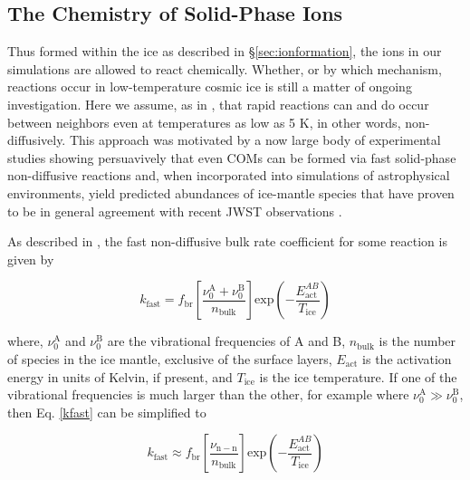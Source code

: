 \documentclass[journal=aesccq,manuscript=article,layout=twocolumn]{achemso}
\begin{document}
\subsection{The Chemistry of Solid-Phase Ions}

Thus formed within the ice as described in \S\ref{sec:ionformation}, the ions in our simulations are allowed to react chemically. Whether, or by which mechanism, reactions occur in low-temperature cosmic ice is still a matter of ongoing investigation. Here we assume, as in \citet{shingledecker_simulating_2019}, that rapid reactions can and do occur between neighbors even at temperatures as low as 5 K, in other words, non-diffusively. This approach was motivated by a now large body of experimental studies showing persuavively that even COMs can be formed via fast solid-phase non-diffusive reactions \citep{abplanalp_study_2016,doddipatla_low-temperature_2021,bergantini_combined_2018,jin_formation_2020,mullikin_condensed-phase_2018,ghesquiere_reactivity_2018} and, when incorporated into simulations of astrophysical environments, yield predicted abundances of ice-mantle species that have proven to be in general agreement with recent JWST observations \citep{shingledecker_efficient_2020,mcclure_ice_2023,yang_corinos_2022}. 

As described in \citet{shingledecker_simulating_2019}, the fast non-diffusive bulk rate coefficient for some reaction  is given by

\begin{equation}
    k_\mathrm{fast} = f_\mathrm{br}\left[\frac{\nu_0^\mathrm{A} + \nu_0^\mathrm{B}}{n_\mathrm{bulk}} \right] \mathrm{exp}\left( - \frac{E_\mathrm{act}^{AB}}{T_\mathrm{ice}}\right)
    \label{kfast}
\end{equation}

\noindent
where, $\nu_0^\mathrm{A}$ and $\nu_0^\mathrm{B}$ are the vibrational frequencies of A and B, $n_\mathrm{bulk}$ is the number of species in the ice mantle, exclusive of the surface layers, $E_\mathrm{act}$ is the activation energy in units of Kelvin, if present, and $T_\mathrm{ice}$ is the ice temperature. If one of the vibrational frequencies is much larger than the other, for example where $\nu_0^\mathrm{A} \gg \nu_0^\mathrm{B}$, then Eq. \eqref{kfast} can be simplified to

\begin{equation}
    k_\mathrm{fast} \approx f_\mathrm{br}\left[\frac{\nu_\mathrm{n-n}}{n_\mathrm{bulk}} \right] \mathrm{exp}\left( - \frac{E_\mathrm{act}^{AB}}{T_\mathrm{ice}}\right)
    \label{kfast2}
\end{equation}
\end{document}
